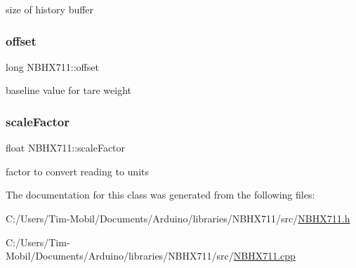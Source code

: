 size of history buffer 

\mbox{\label{class_n_b_h_x711_a2deeadef7a2a07b0f5d799d2b0be13c2}} 
\subsubsection{\texorpdfstring{offset}{offset}}
{\footnotesize\ttfamily long N\+B\+H\+X711\+::offset\hspace{0.3cm}{\ttfamily [protected]}}



baseline value for tare weight 

\mbox{\label{class_n_b_h_x711_a66c39708e8529ec8a510cea042d81dd1}} 
\subsubsection{\texorpdfstring{scale\+Factor}{scaleFactor}}
{\footnotesize\ttfamily float N\+B\+H\+X711\+::scale\+Factor\hspace{0.3cm}{\ttfamily [protected]}}



factor to convert reading to units 



The documentation for this class was generated from the following files\+:\begin{DoxyCompactItemize}
\item 
C\+:/\+Users/\+Tim-\/\+Mobil/\+Documents/\+Arduino/libraries/\+N\+B\+H\+X711/src/\hyperlink{_n_b_h_x711_8h}{N\+B\+H\+X711.\+h}\item 
C\+:/\+Users/\+Tim-\/\+Mobil/\+Documents/\+Arduino/libraries/\+N\+B\+H\+X711/src/\hyperlink{_n_b_h_x711_8cpp}{N\+B\+H\+X711.\+cpp}\end{DoxyCompactItemize}
